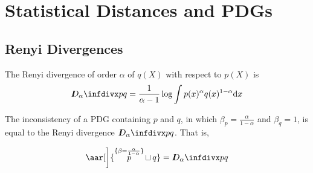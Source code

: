 \documentclass[the-pdg-manual.tex]{subfiles}
\begin{document}
    \section{Statistical Distances and PDGs}


    \subsection{Renyi Divergences}
    The Renyi divergence of order $\alpha$ of $q(X)$ with respect to $p(X)$ is
    \[ \Div[\alpha] p q = \frac1{\alpha -1}\log \int p(x)^\alpha q(x)^{1-\alpha} \mathrm dx \]

    \begin{prop}
        The inconsistency of a PDG containing $p$ and $q$, in which $\beta_p = \frac{\alpha}{1-\alpha}$ and $\beta_q = 1$, is equal to the Renyi divergence $\Div[\alpha]p q$.
        That is, 

        \[ \aar[\bigg]{\overset{\{\beta=\frac{\alpha}{1-\alpha}\}}p \bundle q} = \Div[\alpha]p q \]
    \end{prop}
\end{document}
